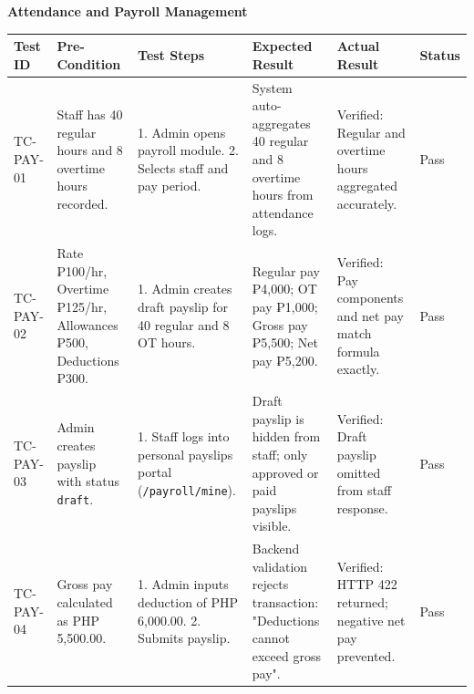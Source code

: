 \documentclass[12pt, letterpaper]{article}
\begin{document}
\begin{landscape}

    

\begin{center}\textbf{Attendance and Payroll Management}\end{center}
\centering

\begin{tabular}{p{2.2cm} p{3.8cm} p{5cm} p{5cm} p{3.5cm} p{1.5cm}}
\toprule
\textbf{Test ID} & \textbf{Pre-Condition} & \textbf{Test Steps} & \textbf{Expected Result} & \textbf{Actual Result} & \textbf{Status} \\
\midrule
TC-PAY-01 & Staff has 40 regular hours and 8 overtime hours recorded. & 1. Admin opens payroll module. 2. Selects staff and pay period. & System auto-aggregates 40 regular and 8 overtime hours from attendance logs. & Verified: Regular and overtime hours aggregated accurately. & Pass \\
TC-PAY-02 & Rate ₱100/hr, Overtime ₱125/hr, Allowances ₱500, Deductions ₱300. & 1. Admin creates draft payslip for 40 regular and 8 OT hours. & Regular pay ₱4,000; OT pay ₱1,000; Gross pay ₱5,500; Net pay ₱5,200. & Verified: Pay components and net pay match formula exactly. & Pass \\
TC-PAY-03 & Admin creates payslip with status \texttt{draft}. & 1. Staff logs into personal payslips portal (\texttt{/payroll/mine}). & Draft payslip is hidden from staff; only approved or paid payslips visible. & Verified: Draft payslip omitted from staff response. & Pass \\
TC-PAY-04 & Gross pay calculated as PHP 5,500.00. & 1. Admin inputs deduction of PHP 6,000.00. 2. Submits payslip. & Backend validation rejects transaction: "Deductions cannot exceed gross pay". & Verified: HTTP 422 returned; negative net pay prevented. & Pass \\
\bottomrule
\end{tabular}


\end{landscape}

\clearpage

\newpage
\end{document}
